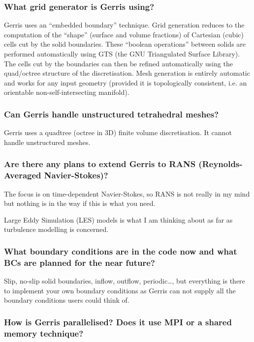 \documentclass[a4paper]{article}
\begin{document}
\subsubsection{What grid generator is Gerris using?}

Gerris uses an ``embedded boundary'' technique. Grid generation reduces
to the computation of the ``shape'' (surface and volume fractions) of
Cartesian (cubic) cells cut by the solid boundaries. These ``boolean
operations'' between solids are performed automatically using GTS (the
GNU Triangulated Surface Library). The cells cut by the boundaries can
then be refined automatically using the quad/octree structure of the
discretisation. Mesh generation is entirely automatic and works for
any input geometry (provided it is topologically consistent, i.e. an
orientable non-self-intersecting manifold).

\subsubsection{Can Gerris handle unstructured tetrahedral meshes?}

Gerris uses a quadtree (octree in 3D) finite volume discretisation. It
cannot handle unstructured meshes.

\subsubsection{Are there any plans to extend Gerris to RANS (Reynolds-Averaged Navier-Stokes)?}

The focus is on time-dependent Navier-Stokes, so RANS is not really in
my mind but nothing is in the way if this is what you need.

Large Eddy Simulation (LES) models is what I am thinking about as far
as turbulence modelling is concerned.

\subsubsection{What boundary conditions are in the code now and what
BCs are planned for the near future?}

Slip, no-slip solid boundaries, inflow, outflow, periodic\dots, but
everything is there to implement your own boundary conditions as
Gerris can not supply all the boundary conditions users could think
of.

\subsubsection{How is Gerris parallelised? Does it use MPI or a shared memory technique?}
\end{document}

